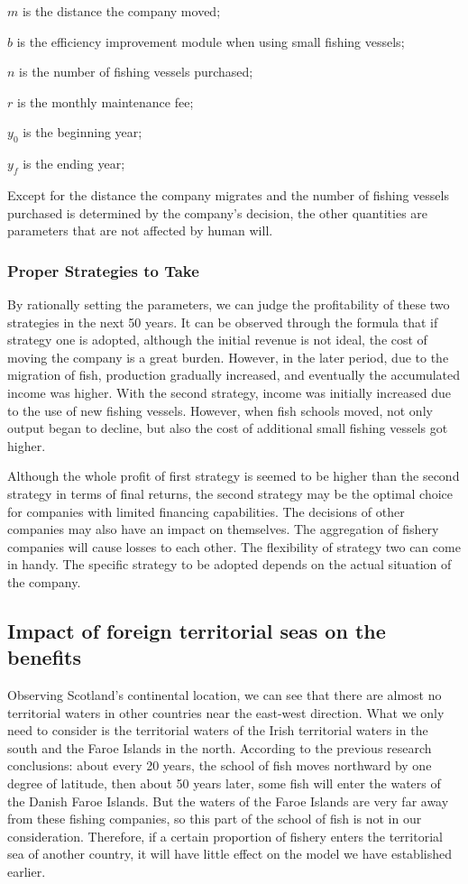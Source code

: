 \documentclass{mcmthesis}
\numberwithin{figure}{section}
\numberwithin{table}{section}
\begin{document}
$m$ is the distance the company moved;

$b$ is the efficiency improvement module when using small fishing vessels;

$n$ is the number of fishing vessels purchased;

$r$ is the monthly maintenance fee;

$y_0$ is the beginning year;

$y_f$ is the ending year;

Except for the distance the company migrates and the number of fishing vessels purchased is determined by the company's decision, the other quantities are parameters that are not affected by human will.

\subsubsection{Proper Strategies to Take}
By rationally setting the parameters, we can judge the profitability of these two strategies in the next 50 years. It can be observed through the formula that if strategy one is adopted, although the initial revenue is not ideal, the cost of moving the company is a great burden. However, in the later period, due to the migration of fish, production gradually increased, and eventually the accumulated income was higher. With the second strategy, income was initially increased due to the use of new fishing vessels. However, when fish schools moved, not only output began to decline, but also the cost of additional small fishing vessels got higher.

Although the whole profit of first strategy is seemed to be higher than the second strategy in terms of final returns, the second strategy may be the optimal choice for companies with limited financing capabilities. The decisions of other companies may also have an impact on themselves. The aggregation of fishery companies will cause losses to each other. The flexibility of strategy two can come in handy. The specific strategy to be adopted depends on the actual situation of the company.

\subsection{Impact of foreign territorial seas on the benefits}
Observing Scotland's continental location, we can see that there are almost no territorial waters in other countries near the east-west direction. What we only need to consider is the territorial waters of the Irish territorial waters in the south and the Faroe Islands in the north. According to the previous research conclusions: about every 20 years, the school of fish moves northward by one degree of latitude, then about 50 years later, some fish will enter the waters of the Danish Faroe Islands. But the waters of the Faroe Islands are very far away from these fishing companies, so this part of the school of fish is not in our consideration. Therefore, if a certain proportion of fishery enters the territorial sea of another country, it will have little effect on the model we have established earlier.
\end{document}
